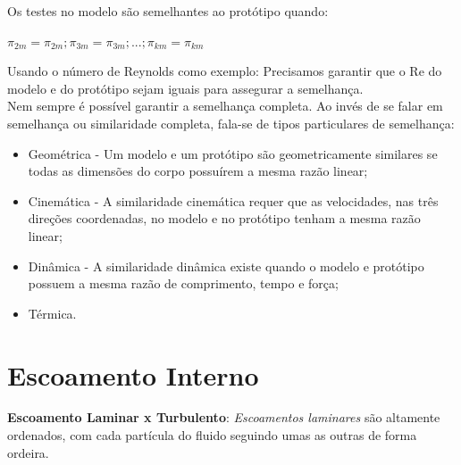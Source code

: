 \documentclass[a4paper, 12pt]{article}
\begin{document}
	Os testes no modelo são semelhantes ao protótipo quando:
	\begin{center}
		\Large
		$
		\pi_{2m} = \pi_{2m};\pi_{3m} = \pi_{3m};...;\pi_{km} = \pi_{km}
		$
	\end{center}
	Usando o número de Reynolds como exemplo: Precisamos garantir que o Re do modelo e do protótipo sejam iguais para assegurar a semelhança.\\
	
	Nem sempre é possível garantir a semelhança completa.
	Ao invés de se falar em semelhança ou similaridade completa, fala-se de tipos particulares de semelhança:
	\begin{itemize}
		\item Geométrica - Um modelo e um protótipo são geometricamente similares se todas as dimensões do corpo possuírem a mesma razão linear;
		\item Cinemática - A similaridade cinemática requer que as velocidades, nas três direções coordenadas, no modelo e no protótipo tenham a mesma razão linear;
		\item Dinâmica - A  similaridade dinâmica existe quando o modelo e protótipo possuem a mesma razão de comprimento, tempo e força;
		\item Térmica.
	\end{itemize}

\section{Escoamento Interno}
	\textbf{Escoamento Laminar x Turbulento}: \textit{Escoamentos laminares} são altamente ordenados, com cada partícula do fluido seguindo umas as outras de forma ordeira.
	
\end{document}
